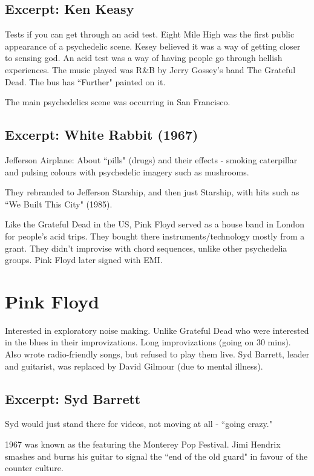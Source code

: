 \documentclass[12pt, a4paper, twoside, openright, titlepage]{book}
\begin{document}
\subsection{Excerpt: Ken Keasy}

Tests if you can get through an acid test. Eight Mile High was the first public appearance of a psychedelic scene. Kesey believed it was a way of getting closer to sensing god. An acid test was a way of having people go through hellish experiences. The music played was R\&B by Jerry Gossey's band The Grateful Dead. The bus has ``Further" painted on it.


The main psychedelics scene was occurring in San Francisco. 

\subsection{Excerpt: White Rabbit (1967)}

Jefferson Airplane: About ``pills" (drugs) and their effects - smoking caterpillar and pulsing colours with psychedelic imagery such as mushrooms. 


They rebranded to Jefferson Starship, and then just Starship, with hits such as ``We Built This City" (1985).


Like the Grateful Dead in the US, Pink Floyd served as a house band in London for people's acid trips. They bought there instruments/technology mostly from a grant. They didn't improvise with chord sequences, unlike other psychedelia groups. Pink Floyd later signed with EMI.


\section{Pink Floyd}

Interested in exploratory noise making. Unlike Grateful Dead who were interested in the blues in their improvizations. Long improvizations (going on 30 mins). Also wrote radio-friendly songs, but refused to play them live. Syd Barrett, leader and guitarist, was replaced by David Gilmour (due to mental illness).

\subsection{Excerpt: Syd Barrett}

Syd would just stand there for videos, not moving at all - ``going crazy." 


1967 was known as the  featuring the Monterey Pop Festival. Jimi Hendrix smashes and burns his guitar to signal the ``end of the old guard" in favour of the counter culture.
\end{document}
